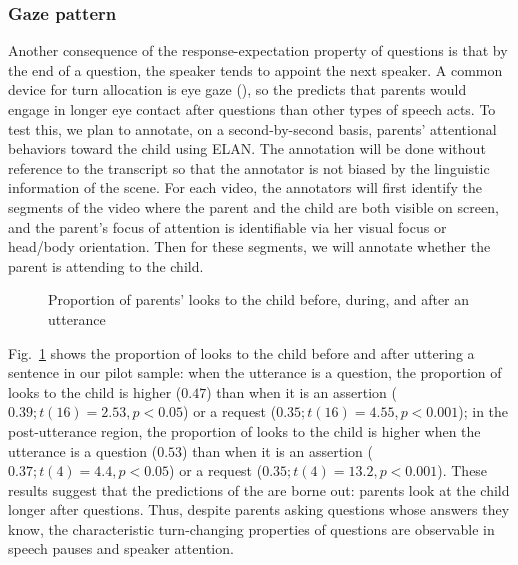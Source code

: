 \subsubsection{Gaze pattern}
\label{sec:engsp:results:gaze}



Another consequence of the response-expectation property of questions is that by the end of a question, the speaker tends to appoint the next speaker. A common device for turn allocation is eye gaze (\citealt{argyle1972gaze, kendon1967gaze,duncan1979gaze, rossano2009gaze}), so the \hypos{} predicts that parents would engage in longer eye contact after questions than other types of speech acts. To test this, we plan to annotate, on a second-by-second basis, parents' attentional behaviors toward the child using ELAN. The annotation will be done without reference to the transcript so that the annotator is not biased by the linguistic information of the scene. For each video, the annotators will first identify the segments of the video where the parent and the child are both visible on screen, and the parent’s focus of attention is identifiable via her visual focus or head/body orientation. Then for these segments, we will annotate whether the parent is attending to the child.  


\begin{figure}[H]

\begin{center}
	\caption{Proportion of parents' looks to the child before, during, and after an utterance} \label{fg:attention}
\end{center}
\end{figure}


Fig.~\ref{fg:attention} shows the proportion of looks to the child before and after uttering a sentence in our pilot sample: when the utterance is a question, the proportion of looks to the child is higher ($0.47$) than when it is an assertion ($0.39; t(16) = 2.53, p <0.05$) or a request ($0.35; t(16)= 4.55, p<0.001$); in the post-utterance region, the proportion of looks to the child is higher when the utterance is a question ($0.53$) than when it is an assertion ($0.37; t(4) = 4.4, p<0.05$) or a request ($0.35; t(4) = 13.2, p<0.001$). These results suggest that the predictions of the \hypos{} are borne out: parents look at the child longer after questions. Thus, despite parents asking questions whose answers they know, the characteristic turn-changing properties of questions are observable in speech pauses and speaker attention. 


